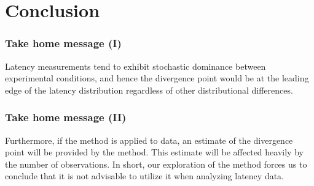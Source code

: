 \documentclass{beamer}
\begin{document}
\section{Conclusion}
{

	\frame
	{
	\frametitle{Take home message (I)}

Latency measurements tend to exhibit stochastic dominance between experimental conditions, and hence the divergence point would be at the leading edge of the latency distribution regardless of other distributional differences.
}


	\frame
	{

		\frametitle{Take home message (II)}

  Furthermore, if the method is applied to data, an estimate of the divergence point will be provided by the method. This estimate will be affected heavily by the number of observations.   In short, our exploration of the method forces us to conclude that it is not advisable to utilize it when analyzing latency data.

	
	
	}			
	
	
}
\end{document}
